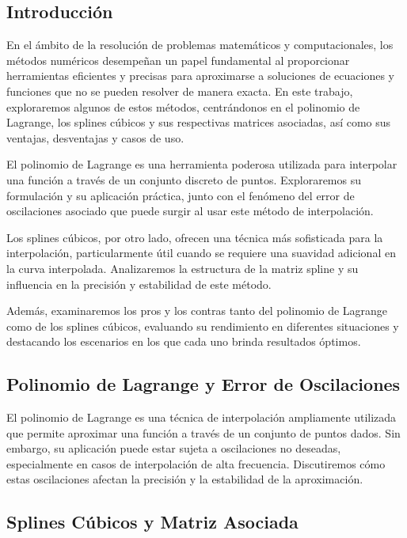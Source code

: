\documentclass[12pt,a4]{article} %
\begin{document}
\begin{multicols}{2}
\raggedcolumns

\section{Introducción}

En el ámbito de la resolución de problemas matemáticos y computacionales, los métodos numéricos desempeñan un papel fundamental al proporcionar herramientas eficientes y precisas para aproximarse a soluciones de ecuaciones y funciones que no se pueden resolver de manera exacta. En este trabajo, exploraremos algunos de estos métodos, centrándonos en el polinomio de Lagrange, los splines cúbicos y sus respectivas matrices asociadas, así como sus ventajas, desventajas y casos de uso.

El polinomio de Lagrange es una herramienta poderosa utilizada para interpolar una función a través de un conjunto discreto de puntos. Exploraremos su formulación y su aplicación práctica, junto con el fenómeno del error de oscilaciones asociado que puede surgir al usar este método de interpolación.

Los splines cúbicos, por otro lado, ofrecen una técnica más sofisticada para la interpolación, particularmente útil cuando se requiere una suavidad adicional en la curva interpolada. Analizaremos la estructura de la matriz spline y su influencia en la precisión y estabilidad de este método.

Además, examinaremos los pros y los contras tanto del polinomio de Lagrange como de los splines cúbicos, evaluando su rendimiento en diferentes situaciones y destacando los escenarios en los que cada uno brinda resultados óptimos.

\subsection{Polinomio de Lagrange y Error de Oscilaciones}
 
El polinomio de Lagrange es una técnica de interpolación ampliamente utilizada que permite aproximar una función a través de un conjunto de puntos dados. Sin embargo, su aplicación puede estar sujeta a oscilaciones no deseadas, especialmente en casos de interpolación de alta frecuencia. Discutiremos cómo estas oscilaciones afectan la precisión y la estabilidad de la aproximación.

\subsection{Splines Cúbicos y Matriz Asociada}


\end{multicols}
\end{document}
